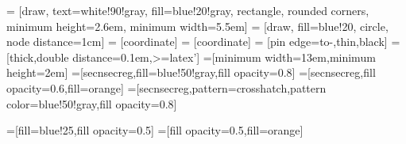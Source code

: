 \usetikzlibrary{shapes,arrows,calc,patterns,backgrounds,fit}

 = [draw, text=white!90!gray, fill=blue!20!gray, rectangle, rounded corners, minimum height=2.6em, minimum width=5.5em]
 = [draw, fill=blue!20, circle, node distance=1cm]
 = [coordinate]
 = [coordinate]
 = [pin edge={to-,thin,black}]
 = [thick,double distance=0.1em,>=latex']
=[minimum width=13em,minimum height=2em]
=[secnsecreg,fill=blue!50!gray,fill opacity=0.8]
=[secnsecreg,fill opacity=0.6,fill=orange]
=[secnsecreg,pattern=crosshatch,pattern color=blue!50!gray,fill opacity=0.8]

=[fill=blue!25,fill opacity=0.5]
=[fill opacity=0.5,fill=orange]

\makeatletter
{}
\makeatother
\newcommand{\mytikzrefnode}[1]{\tikz[remember picture,baseline=-.5ex] \coordinate (#1) {};}
